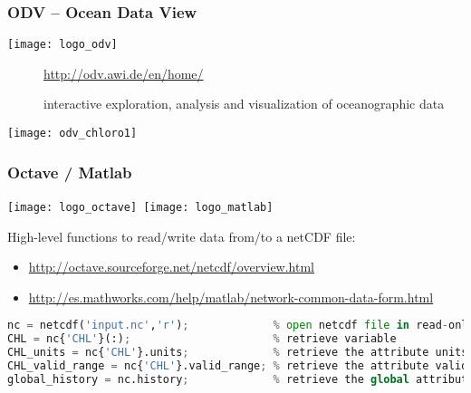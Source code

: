 \begin{frame}[c]
\frametitle{ODV -- Ocean Data View}

\texttt{[image: logo\_odv]}

\begin{description}
\item[\homepage] \url{http://odv.awi.de/en/home/}
\item[\tool] interactive exploration, analysis and visualization of oceanographic data
\end{description}

\texttt{[image: odv\_chloro1]}

\end{frame}

\begin{frame}[c, fragile]
\frametitle{Octave / Matlab}

\texttt{[image: logo\_octave]}~\texttt{[image: logo\_matlab]}


High-level functions to read/write data from/to a netCDF file:\\
{\scriptsize
\begin{itemize}
\item \url{http://octave.sourceforge.net/netcdf/overview.html}
\item \url{http://es.mathworks.com/help/matlab/network-common-data-form.html}
\end{itemize}

}
\vfill

\begin{lstlisting}[language=python,basicstyle=\tiny,title=Example with Octave]
nc = netcdf('input.nc','r');             % open netcdf file in read-only
CHL = nc{'CHL'}(:);                      % retrieve variable 
CHL_units = nc{'CHL'}.units;             % retrieve the attribute units
CHL_valid_range = nc{'CHL'}.valid_range; % retrieve the attribute valid_range 
global_history = nc.history;             % retrieve the global attribute history

\end{lstlisting}

\end{frame}

